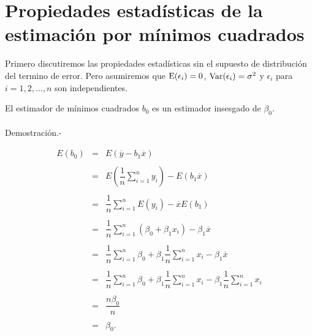 \section{Propiedades estadísticas de la estimación por mínimos cuadrados}

Primero discutiremos las propiedades estadísticas sin el supuesto de distribución del termino de error. Pero asumiremos que $\mathop{\mbox{\normalfont E}}\nolimits(\epsilon_i)=0$, $\mathop{\mbox{\normalfont Var}}\nolimits(\epsilon_i)=\sigma^2$ y $\epsilon_i$ para $i=1,2,\ldots,n$ son independientes.\\


\begin{teo}
    El estimador de mínimos cuadrados $b_0$ es un estimador insesgado de $\beta_0$.\\\\

	Demostración.-\; 

	$$
	\begin{array}{rcl}
	    E(b_0) &=& E(\overline{y}-b_1\overline{x})\\\\
	    &=& E\left(\dfrac{1}{n}\displaystyle\sum_{i=1}^n y_i\right)-E\left(b_1\overline{x}\right)\\\\
		       &=& \dfrac{1}{n}\displaystyle\sum_{i=1}^n E(y_i)-\overline{x}E(b_1)\\\\
		   &=&\dfrac{1}{n}\displaystyle\sum_{i=1}^n (\beta_0+\beta_1x_i)-\beta_1\overline{x}\\\\
		   &=&\dfrac{1}{n} \displaystyle\sum_{i=1}^n \beta_0 + \beta_1 \dfrac{1}{n}\displaystyle\sum_{i=1}^nx_i-\beta_1\overline{x}\\\\
		   &=&\dfrac{1}{n} \displaystyle\sum_{i=1}^n \beta_0 + \beta_1 \dfrac{1}{n}\displaystyle\sum_{i=1}^nx_i-\beta_1\dfrac{1}{n}\displaystyle\sum_{i=1}^n x_i\\\\
		   &=& \dfrac{n\beta_0}{n}\\\\
		       &=&\beta_0.
	\end{array}
	$$
\end{teo}

